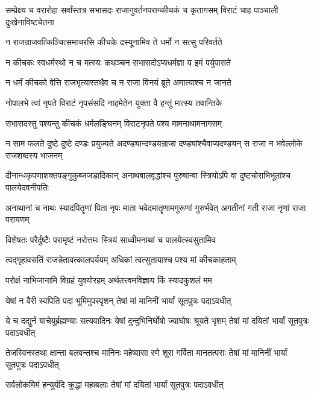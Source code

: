 \threelineshloka
{सम्प्रेक्ष्य च वरारोहा सर्वांस्तत्र सभासदः}
{राजानुवर्तनपरान्कीचकं च कृतागसम्}
{विराटं चाह पाञ्चाली दुःखेनाविष्टचेतना}


\twolineshloka
{न राजन्राजवत्किञ्चित्समाचरसि कीचके}
{दस्यूनामिव ते धर्मो न सत्सु परिवर्तते}


\twolineshloka
{न कीचकः स्वधर्मस्थो न च मत्स्यः कथञ्चन}
{सभासदोऽप्यधर्मज्ञा य इमं पर्युपासते}


\twolineshloka
{न धर्मं कीचको वेत्ति राजभृत्यास्तथैव च}
{न राजा विनयं ब्रूते अमात्याश्च न जानते}


\twolineshloka
{नोपालभे त्वां नृपते विराटं नृपसंसदि}
{नाहमेतेन युक्ता वै हन्तुं मात्स्य तवान्तिके}


\twolineshloka
{सभासदस्तु पश्यन्तु कीचकं धर्मलङ्घिनम्}
{विराटनृपते पश्य मामनाथामनागसम्}


\onelineshloka
{न साम फलते दुष्टे दुष्टे दण्डः प्रयुज्यते}
\twolineshloka
{अदण्ड्यान्दण्डयन्राजा दण्ड्यांश्चैवाप्यदण्डयन्}
{स राजा न भवेल्लोके राजशब्दस्य भाजनम्}


\threelineshloka
{दीनान्धकृपणाशक्तपङ्गुकुब्जजडादिकान्}
{अनाथबालवृद्धांश्च पुरुषान्वा स्त्रियोऽपि वा}
{दुष्टचोराभिभूतांश्च पालयेदवनीपतिः}


\threelineshloka
{अनाथानां च नाथः स्यादपितॄणां पिता नृपः}
{माता भवेदमातॄणामगुरूणां गुरुर्भवेत्}
{अगतीनां गती राजा नृणां राजा परायणम्}


\twolineshloka
{विशेषतः परैर्दुष्टैः परामृष्टं नरोत्तमः}
{स्त्रियं साध्वीमनाथां च पालयेत्स्वसुतामिव}


\twolineshloka
{त्वद्गृहावसतिं राजन्नेतावत्कालपर्ययम्}
{अधिकां त्वत्सुतायाश्च पश्य मां कीचकाहताम्}




\twolineshloka
{परोक्षं नाभिजानामि विग्रहं युवयोरहम्}
{अर्थतत्त्वमविज्ञाय किं स्यादकुशलं मम}




\twolineshloka
{येषां न वैरी स्वपिति पदा भूमिमुपस्पृशन्}
{तेषां मां मानिनीं भार्यां सूतपुत्रः पदाऽवधीत्}


\threelineshloka
{ये च दद्युर्न याचेयुर्ब्रह्मण्याः सत्यवादिनः}
{येषां दुन्दुभिनिर्घोषो ज्याघोषः श्रूयते भृशम्}
{तेषां मां दयितां भार्यां सूतपुत्रः पदाऽवधीत्}


\threelineshloka
{तेजस्विनस्तथा क्षान्ता बलवन्तश्च मानिनः}
{महेष्वासा रणे शूरा गर्विता मानतत्पराः}
{तेषां मां मानिनीं भार्यां सूतपुत्रः पदाऽवधीत्}


\twolineshloka
{सर्वलोकमिमं हन्युर्यदि क्रुद्धा महाबलाः}
{तेषां मां दयितां भार्यां सूतपुत्रः पदाऽवधीत्}


